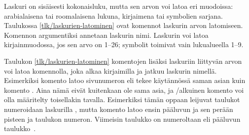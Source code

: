 \begin{koodilohkosis}
\setcounter{oma}{3}    %
\addtocounter{oma}{1}  %
\addtocounter{oma}{-1} %
\end{koodilohkosis}

\noindent
Laskuri on sisäisesti kokonaisluku, mutta sen arvon voi latoa eri
muodoissa: arabialaisena tai roomalaisena lukuna, kirjaimena tai
symbolien sarjana. Taulukossa \ref{tlk/laskurien-latominen} ovat komennot
laskurin arvon latomiseen. Komennon argumentiksi annetaan laskurin nimi.
Laskurin voi latoa kirjainmuodossa, jos sen arvo on 1--26; symbolit
toimivat vain lukualueella 1--9.


Taulukon \ref{tlk/laskurien-latominen} komentojen lisäksi laskuriin
liittyvän arvon voi latoa komennolla, joka alkaa kirjaimilla
 ja jatkuu laskurin nimellä. Esimerkiksi komento
 latoo sivunumeron eli tekee käytännössä saman asian
kuin komento . Aina nämä eivät
kuitenkaan ole sama asia, ja \-/alkuinen komento voi olla
määritelty toisellakin tavalla. Esimerkiksi tämän oppaan leijuvat
taulukot numeroidaan laskurilla , mutta komento
 latoo ensin pääluvun ja sen perään pisteen ja
taulukon numeron. Viimeisin taulukko on numeroltaan \thetable{} eli
pääluvun~ taulukko~.

